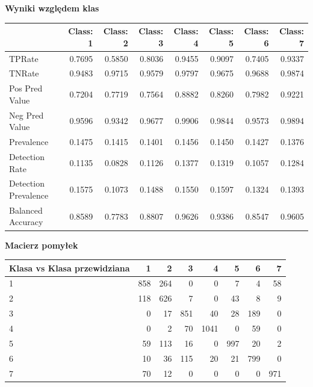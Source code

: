 \documentclass[11pt]{article} %
\begin{document}
\textbf{Wyniki względem klas}

\begin{center}
\begin{tabular}{ | l | r | r | r | r | r | r | r | }
\hline
                    &Class: 1 &Class: 2 &Class: 3 &Class: 4 &Class: 5 &Class: 6 &Class: 7\\ \hline
TPRate          &  0.7695 &  0.5850 &  0.8036 &  0.9455 &  0.9097 &  0.7405 &  0.9337\\
TNRate          &  0.9483 &  0.9715 &  0.9579 &  0.9797 &  0.9675 &  0.9688 &  0.9874\\
Pos Pred Value       &  0.7204 &  0.7719 &  0.7564 &  0.8882 &  0.8260 &  0.7982 &  0.9221\\
Neg Pred Value       &  0.9596 &  0.9342 &  0.9677 &  0.9906 &  0.9844 &  0.9573 &  0.9894\\
Prevalence           &  0.1475 &  0.1415 &  0.1401 &  0.1456 &  0.1450 &  0.1427 &  0.1376\\
Detection Rate       &  0.1135 &  0.0828 &  0.1126 &  0.1377 &  0.1319 &  0.1057 &  0.1284\\
Detection Prevalence &  0.1575 &  0.1073 &  0.1488 &  0.1550 &  0.1597 &  0.1324 &  0.1393\\
Balanced Accuracy    &  0.8589 &  0.7783 &  0.8807 &  0.9626 &  0.9386 &  0.8547 &  0.9605\\ \hline
\end{tabular}
\end{center}

\textbf{Macierz pomyłek}

 \begin{center}
    \begin{tabular}{ | l | r | r | r | r | r | r | r | }
    \hline
 Klasa vs Klasa przewidziana &  1 &  2 &  3 &  4 &  5 &  6 &  7 \\ \hline
1 &  858 & 264 &   0  &  0 &   7 &   4 &  58 \\
2 & 118 & 626 &   7 &   0 &  43 &   8 &   9 \\
3 &  0  & 17 &  851 &  40 &  28 & 189   & 0 \\
4 &  0   & 2 &  70 & 1041 &   0  & 59 &    0 \\
5 &  59  & 113  & 16 &   0 & 997 &  20  &  2 \\
6 &  10 &  36 & 115  & 20 &  21  & 799  &  0 \\
7 &  70  & 12 &   0 &   0  &  0 &   0 &  971 \\ \hline
    \end{tabular}
\end{center}
\end{document}
